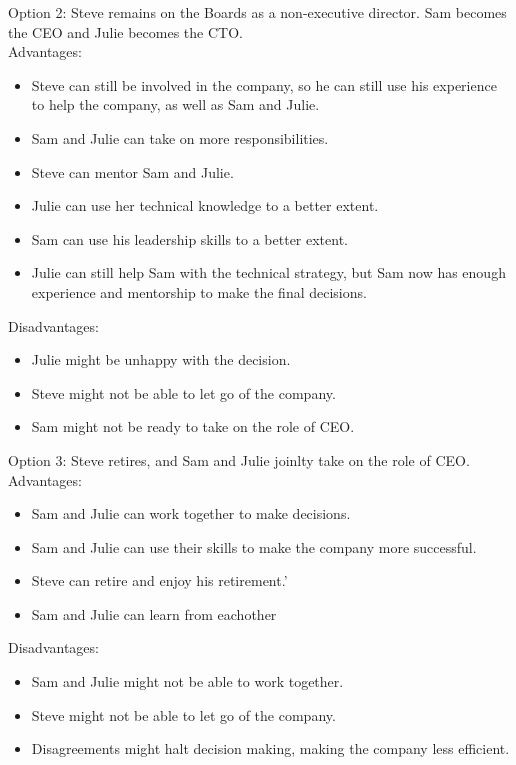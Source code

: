 \documentclass[a4paper,10pt]{article}
\begin{document}
Option 2: Steve remains on the Boards as a non-executive director. Sam becomes the CEO and Julie becomes the CTO.\\

Advantages:\\
\begin{itemize}
    \item Steve can still be involved in the company, so he can still use his experience to help the company, as well as Sam and Julie.
    \item Sam and Julie can take on more responsibilities.
    \item Steve can mentor Sam and Julie.
    \item Julie can use her technical knowledge to a better extent.
    \item Sam can use his leadership skills to a better extent.
    \item Julie can still help Sam with the technical strategy, but Sam now has enough experience and mentorship to make the final decisions.
\end{itemize}

Disadvantages:\\
\begin{itemize}
    \item Julie might be unhappy with the decision.
    \item Steve might not be able to let go of the company.
    \item Sam might not be ready to take on the role of CEO.
\end{itemize}

Option 3: Steve retires, and Sam and Julie joinlty take on the role of CEO.\\

Advantages:\\
\begin{itemize}
    \item Sam and Julie can work together to make decisions.
    \item Sam and Julie can use their skills to make the company more successful.
    \item Steve can retire and enjoy his retirement.'
    \item Sam and Julie can learn from eachother
\end{itemize}

Disadvantages:\\
\begin{itemize}
    \item Sam and Julie might not be able to work together.
    \item Steve might not be able to let go of the company.
    \item Disagreements might halt decision making, making the company less efficient.
\end{itemize}
\end{document}
